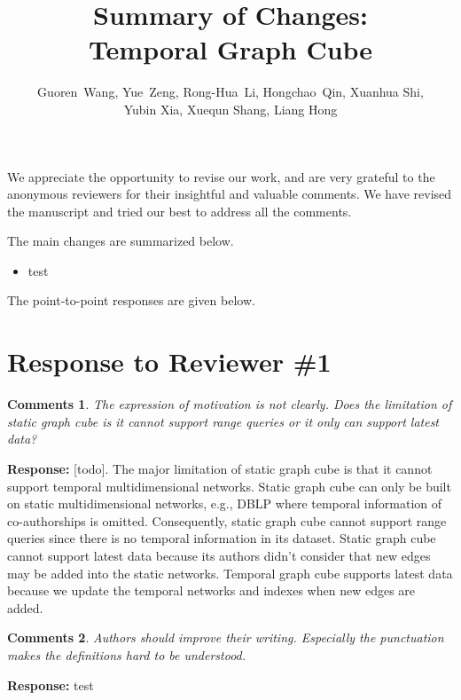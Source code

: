\documentclass{article}
\title{Summary of Changes: \\Temporal Graph Cube}
\author{Guoren~Wang,
	Yue~Zeng,
	Rong-Hua~Li,
	Hongchao~Qin,
	Xuanhua Shi,\\
	Yubin Xia, 
	Xuequn Shang, 
	Liang Hong
}
\date{}
\newtheorem{Comments}{\textbf{Comments}}
\begin{document}
\maketitle

We appreciate the opportunity to revise our work, and are very grateful to the anonymous reviewers for their insightful and valuable comments. We have revised the manuscript and tried our best to address all the comments. 

The main changes are summarized below.
\begin{itemize}

\item test

\end{itemize}

The point-to-point responses are given below.
	
\section{Response to Reviewer \#1}
\begin{Comments}
The expression of motivation is not clearly. Does the limitation of static graph cube is it cannot support range queries or it only can support latest data?
\end{Comments}
\noindent \textbf{Response:} [todo]. The major limitation of static graph cube is that it cannot support temporal multidimensional networks. Static graph cube can only be built on static multidimensional networks, e.g., DBLP where temporal information of co-authorships is omitted. Consequently, static graph cube cannot support range queries since there is no temporal information in its dataset. Static graph cube cannot support latest data because its authors didn't consider that new edges may be added into the static networks. Temporal graph cube supports latest data because we update the temporal networks and indexes when new edges are added.

\begin{Comments}
Authors should improve their writing. Especially the punctuation makes the definitions hard to be understood.
\end{Comments}
\noindent \textbf{Response:} test
\end{document}
